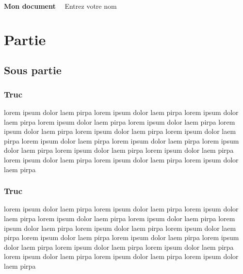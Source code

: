 \documentclass[11pt,fleqn]{book}
\begin{document}
\begingroup
\thispagestyle{empty}
\centering
\vspace*{5cm}
\par\normalfont\fontsize{35}{35}\sffamily\selectfont
\vspace*{2cm}
\textbf{Mon document}\
~\vspace*{1cm}
{\Huge Entrez votre nom}\par %
\endgroup
{} %
							\pagestyle{empty} %
							\tableofcontents %
							\pagestyle{fancy} %
								\chapter{Partie }
\section{Sous partie}
\subsection{Truc}
lorem  ipsum  dolor  laem  pirpa  lorem  ipsum  dolor  laem  pirpa  lorem  ipsum  dolor  laem  pirpa  lorem  ipsum  dolor  laem  pirpa  lorem  ipsum  dolor  laem  pirpa  lorem  ipsum  dolor  laem  pirpa  lorem  ipsum  dolor  laem  pirpa  lorem  ipsum  dolor  laem  pirpa  lorem  ipsum  dolor  laem  pirpa  lorem  ipsum  dolor  laem  pirpa  lorem  ipsum  dolor  laem  pirpa  lorem  ipsum  dolor  laem  pirpa  lorem  ipsum  dolor  laem  pirpa  lorem  ipsum  dolor  laem  pirpa  lorem  ipsum  dolor  laem  pirpa  lorem  ipsum  dolor  laem  pirpa 
~\\
\subsection{Truc}
lorem  ipsum  dolor  laem  pirpa  lorem  ipsum  dolor  laem  pirpa  lorem  ipsum  dolor  laem  pirpa  lorem  ipsum  dolor  laem  pirpa  lorem  ipsum  dolor  laem  pirpa  lorem  ipsum  dolor  laem  pirpa  lorem  ipsum  dolor  laem  pirpa  lorem  ipsum  dolor  laem  pirpa  lorem  ipsum  dolor  laem  pirpa  lorem  ipsum  dolor  laem  pirpa  lorem  ipsum  dolor  laem  pirpa  lorem  ipsum  dolor  laem  pirpa  lorem  ipsum  dolor  laem  pirpa  lorem  ipsum  dolor  laem  pirpa  lorem  ipsum  dolor  laem  pirpa  lorem  ipsum  dolor  laem  pirpa 
~\\
\end{document}
